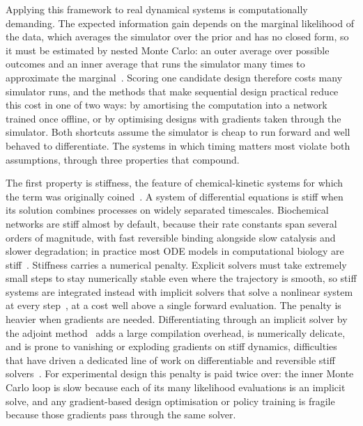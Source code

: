 Applying this framework to real dynamical systems is computationally demanding. The expected information gain depends on the marginal
likelihood of the data, which averages the simulator over the prior and has no closed form,
so it must be estimated by nested Monte Carlo: an outer average over possible outcomes and an
inner average that runs the simulator many times to approximate the
marginal~\citep{ryan2016review,rainforth2018nesting,huan2014simulation}. Scoring one candidate
design therefore costs many simulator runs, and the methods that make sequential design
practical reduce this cost in one of two ways: by amortising the computation into a network
trained once offline, or by optimising designs with gradients taken through the simulator.
Both shortcuts assume the simulator is cheap to run forward and well behaved to differentiate.
The systems in which timing matters most violate both assumptions, through three properties
that compound.

The first property is stiffness, the feature of chemical-kinetic systems for which the term was
originally coined~\citep{curtiss1952integration}. A system of differential equations is stiff
when its solution combines processes on widely separated timescales. Biochemical networks are
stiff almost by default, because their rate constants span several orders of magnitude, with
fast reversible binding alongside slow catalysis and slower degradation; in practice most ODE
models in computational biology are stiff~\citep{stadter2021benchmarking}. Stiffness carries
a numerical penalty. Explicit solvers must take extremely small steps to stay numerically
stable even where the trajectory is smooth, so stiff systems are integrated instead with
implicit solvers that solve a nonlinear system at every step~\citep{hairer1996solving}, at a
cost well above a single forward evaluation. The penalty is heavier when gradients are needed.
Differentiating through an implicit solver by the adjoint method~\citep{chen2018neural} adds a
large compilation overhead, is numerically delicate, and is prone to vanishing or exploding
gradients on stiff dynamics, difficulties that have driven a dedicated line of work on
differentiable and reversible stiff
solvers~\citep{fronk2024stiff,pal2023neural,mccallum2024efficient,caldana2025neural,fronk2025vanishing}.
For experimental design this penalty is paid twice over: the inner Monte Carlo loop is slow
because each of its many likelihood evaluations is an implicit solve, and any gradient-based
design optimisation or policy training is fragile because those gradients pass through the same
solver.

